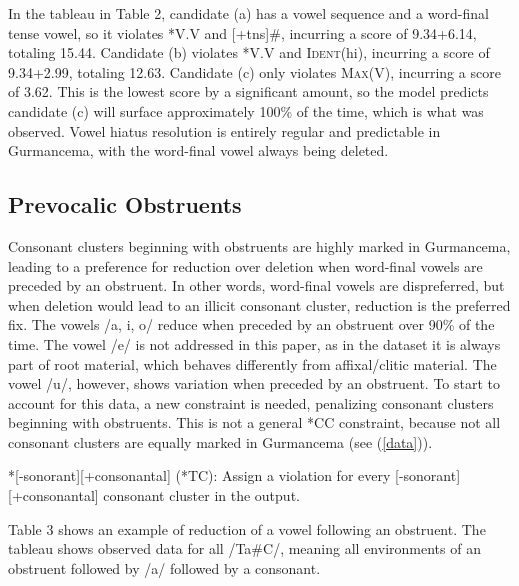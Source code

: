 \documentclass[output=paper,
modfonts
]{langscibook}
\begin{document}
In the tableau in Table 2, candidate (a) has a vowel sequence and a word-final tense vowel, so it violates *V.V and [+tns]\#, incurring a score of 9.34+6.14, totaling 15.44. Candidate (b) violates *V.V and \textsc{Ident}(hi), incurring a score of 9.34+2.99, totaling 12.63. Candidate (c) only violates \textsc{Max}(V), incurring a score of 3.62. This is the lowest score by a significant amount, so the model predicts candidate (c) will surface approximately 100\% of the time, which is what was observed. 
Vowel hiatus resolution is entirely regular and predictable in Gurmancema, with 
the word-final vowel always being deleted.

\subsection{Prevocalic Obstruents}
Consonant clusters beginning with obstruents are highly marked in Gurmancema, 
leading to a preference for reduction over deletion when word-final vowels are preceded by an obstruent. In other words, word-final vowels are dispreferred, but when deletion would lead to an illicit consonant cluster, reduction is the preferred fix. The vowels /a, i, o/ reduce when preceded by an obstruent over 90\% of the time. The vowel /e/ is not addressed in this paper, as in the dataset it is always part of root material, which behaves differently from affixal/clitic material. The vowel /u/, however, shows variation when preceded by an obstruent. To start to account for this data, a new constraint is needed, penalizing consonant clusters beginning with obstruents. This is not a general *CC constraint, because not all consonant clusters are equally marked in Gurmancema (see (\ref{data})). 

\ea \label{tc}
*[-sonorant][+consonantal] (*TC): Assign a violation for every
	[-sonorant][+consonantal] consonant cluster in the output. 
\z

Table 3 shows an example of reduction of a vowel following an obstruent. The tableau shows observed data for all /Ta\#C/, meaning all environments of an obstruent followed by /a/ followed by a consonant. 
\end{document}
